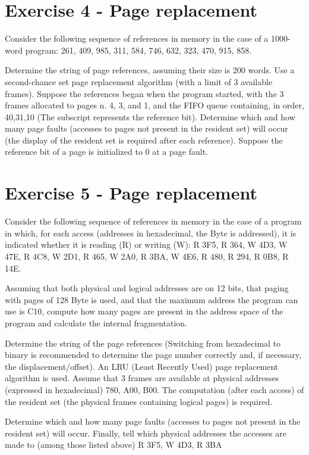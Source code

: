\section{Exercise 4 - Page replacement}

Consider the following sequence of references in memory in the case of a 1000-word program: 261, 409, 985, 311, 584, 746, 632, 323, 470, 915, 858.

Determine the string of page references, assuming their size is 200 words. Use a second-chance set page replacement algorithm (with a limit of 3 available frames). Suppose the references began when the program started, with the 3 frames allocated to pages n. 4, 3, and 1, and the FIFO queue containing, in order, 40,31,10 (The subscript represents the reference bit). Determine which and how many page faults (accesses to pages not present in the resident set) will occur (the display of the resident set is required after each reference). Suppose the reference bit of a page is initialized to 0 at a page fault.

\section{Exercise 5 - Page replacement}

Consider the following sequence of references in memory in the case of a program in which, for each access (addresses in hexadecimal, the Byte is addressed), it is indicated whether it is reading (R) or writing (W): R 3F5, R 364, W 4D3, W 47E, R 4C8, W 2D1, R 465, W 2A0, R 3BA, W 4E6, R 480, R 294, R 0B8, R 14E.

Assuming that both physical and logical addresses are on 12 bits, that paging with pages of 128 Byte is used, and that the maximum address the program can use is C10, compute how many pages are present in the address space of the program and calculate the internal fragmentation.

Determine the string of the page references (Switching from hexadecimal to binary is recommended to determine the page number correctly and, if necessary, the displacement/offset). An LRU (Least Recently Used) page replacement algorithm is used. Assume that 3 frames are available at physical addresses (expressed in hexadecimal) 780, A00, B00. The computation (after each access) of the resident set (the physical frames containing logical pages) is required.

Determine which and how many page faults (accesses to pages not present in the resident set) will occur.
Finally, tell which physical addresses the accesses are made to (among those listed above) R 3F5, W 4D3, R 3BA


